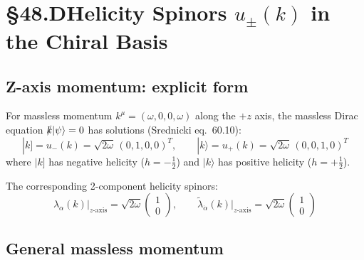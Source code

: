 
\section{§48.D\quad Helicity Spinors $u_\pm(k)$ in the Chiral Basis}

\subsection{Z-axis momentum: explicit form}

For massless momentum $k^\mu=(\omega,0,0,\omega)$ along the $+z$ axis,
the massless Dirac equation $\slashed{k}|\psi\rangle=0$ has solutions
(Srednicki eq.~60.10):
\begin{equation}
  |k] = u_-(k) = \sqrt{2\omega}\,(0,1,0,0)^T,
  \qquad
  |k\rangle = u_+(k) = \sqrt{2\omega}\,(0,0,1,0)^T
  \tag{48.9}
\end{equation}
where $|k]$ has negative helicity ($h=-\tfrac12$) and $|k\rangle$ has positive helicity ($h=+\tfrac12$).

The corresponding 2-component helicity spinors:
\begin{equation}
  \lambda_\alpha(k)\big|_{z\text{-axis}} = \sqrt{2\omega}\begin{pmatrix}1\\0\end{pmatrix},
  \qquad
  \tilde\lambda_{\dot\alpha}(k)\big|_{z\text{-axis}} = \sqrt{2\omega}\begin{pmatrix}1\\0\end{pmatrix}
  \tag{48.10}
\end{equation}

\verified{Massless Dirac eq.\ $\slashed{k}|k] = 0$: max error $0.0\times10^0$ (exact).}

\subsection{General massless momentum}

